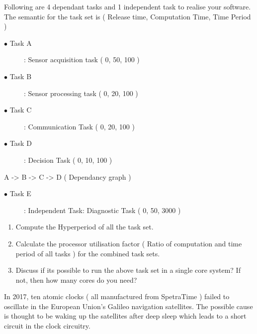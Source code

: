 
\pagebreak

Following are 4 dependant tasks and 1 independent task to realise your software.
The semantic for the task set is ( Release time, Computation Time, Time Period )
\begin{description}
\item[$\bullet$ Task A] : Sensor acquisition task ( 0, 50, 100 ) 
\item[$\bullet$ Task B] : Sensor processing task ( 0, 20, 100 ) 
\item[$\bullet$ Task C] : Communication Task ( 0, 20, 100 )
\item[$\bullet$ Task D]: Decision Task ( 0, 10, 100 )
\end{description}
A -> B -> C -> D ( 
Dependancy graph )
\begin{description}
\item[$\bullet$ Task E] : Independent Task: Diagnostic Task ( 0, 50, 3000 )
\end{description}

\begin{enumerate}
\item Compute the Hyperperiod of all the task set.
\item Calculate the processor utilisation factor ( Ratio of computation and time period of all tasks ) for the combined task sets.
\item Discuss if its possible to run the above task set in a single core system? If not, then how many cores do you need? 
\end{enumerate}



\pagebreak


In 2017, ten atomic clocks ( all manufactured from SpetraTime ) failed to oscillate in the European Union’s Galileo navigation satellites.
The possible cause is thought to be waking up the satellites after deep sleep which leads to a short circuit in the clock circuitry.
 
